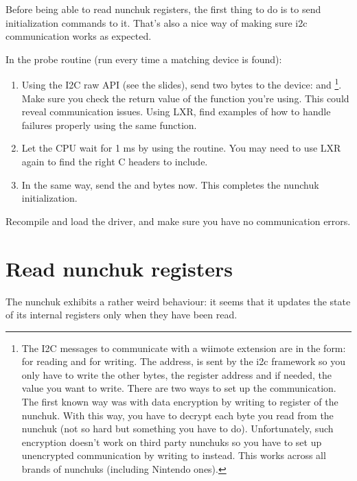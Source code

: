 Before being able to read nunchuk registers, the first thing to do is
to send initialization commands to it. That's also a nice way of making
sure i2c communication works as expected.

In the probe routine (run every time a matching device is found):

\begin{enumerate}
\item Using the I2C raw API (see the slides), send two bytes to the
      device:  and \footnote{
	The I2C messages to communicate with a wiimote
        extension are in the form: 
        for reading and  for
        writing. The address,  is sent by the i2c framework
        so you only have to write the other bytes, the register
        address and if needed, the value you want to write. There are
        two ways to set up the communication. The first known way was
        with data encryption by writing  to register
         of the nunchuk.  With this way, you have to
        decrypt each byte you read from the nunchuk (not so hard but
        something you have to do).  Unfortunately, such encryption
        doesn't work on third party nunchuks so you have to set up
        unencrypted communication by writing  to
         instead. This works across all brands of nunchuks
        (including Nintendo ones).}.
      Make sure you check the return value of the function you're
      using. This could reveal communication issues.  Using LXR, find
      examples of how to handle failures properly using the same
      function.
\item Let the CPU wait for 1 ms by using the  routine.
      You may need to use LXR again to find the right C headers to
      include.
\item In the same way, send the  and  bytes now.
      This completes the nunchuk initialization.
\end{enumerate}

Recompile and load the driver, and make sure you have no communication
errors.

\section{Read nunchuk registers}

The nunchuk exhibits a rather weird behaviour: it seems that it updates
the state of its internal registers only when they have been read.

